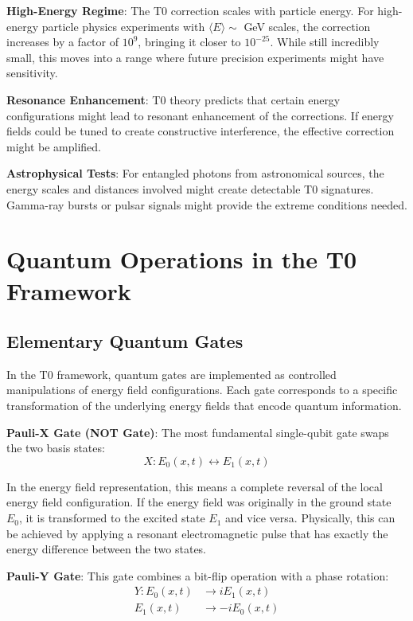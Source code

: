 \documentclass[12pt,a4paper]{article}
\theoremstyle{definition}
\theoremstyle{remark}
\begin{document}
	\textbf{High-Energy Regime}: The T0 correction scales with particle energy. For high-energy particle physics experiments with $\langle E \rangle \sim$ GeV scales, the correction increases by a factor of $10^9$, bringing it closer to $10^{-25}$. While still incredibly small, this moves into a range where future precision experiments might have sensitivity.
	
	\textbf{Resonance Enhancement}: T0 theory predicts that certain energy configurations might lead to resonant enhancement of the corrections. If energy fields could be tuned to create constructive interference, the effective correction might be amplified.
	
	\textbf{Astrophysical Tests}: For entangled photons from astronomical sources, the energy scales and distances involved might create detectable T0 signatures. Gamma-ray bursts or pulsar signals might provide the extreme conditions needed.
	
	\section{Quantum Operations in the T0 Framework}
	
	\subsection{Elementary Quantum Gates}
	
	In the T0 framework, quantum gates are implemented as controlled manipulations of energy field configurations. Each gate corresponds to a specific transformation of the underlying energy fields that encode quantum information.
	
	\textbf{Pauli-X Gate (NOT Gate)}:
	The most fundamental single-qubit gate swaps the two basis states:
	\begin{equation}
		X: E_0(x,t) \leftrightarrow E_1(x,t)
		\label{eq:pauli_x_gate}
	\end{equation}
	
	In the energy field representation, this means a complete reversal of the local energy field configuration. If the energy field was originally in the ground state $E_0$, it is transformed to the excited state $E_1$ and vice versa. Physically, this can be achieved by applying a resonant electromagnetic pulse that has exactly the energy difference between the two states.
	
	\textbf{Pauli-Y Gate}:
	This gate combines a bit-flip operation with a phase rotation:
	\begin{align}
		Y: E_0(x,t) &\rightarrow i E_1(x,t) \\
		E_1(x,t) &\rightarrow -i E_0(x,t)
	\end{align}
	
\end{document}
